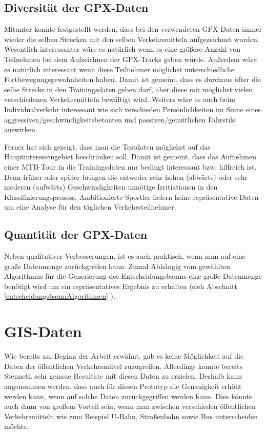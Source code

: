 \subsection{Diversität der GPX-Daten}
Mitunter konnte festgestellt werden, dass bei den verwendeten GPX-Daten immer wieder die selben Strecken mit den selben Verkehrsmitteln aufgezeichnet wurden. Wesentlich interessanter wäre es natürlich wenn es eine größere Anzahl von Teilnehmen bei dem Aufzeichnen der GPX-Tracks geben würde. Außerdem wäre es natürlich interessant wenn diese Teilnehmer möglichst unterschiedliche Fortbewegungsgewohnheiten haben. Damit ist gemeint, dass es durchaus öfter die selbe Strecke in den Trainingsdaten geben darf, aber diese mit möglichst vielen verschiedenen Verkehrsmitteln bewältigt wird. Weiters wäre es auch beim Individualverkehr interessant wie sich verschieden Persönlichkeiten im Sinne eines aggressiven/geschwindigkeitsbetonten und passiven/gemütlichen Fahrstils auswirken. 

Ferner hat sich gezeigt, dass man die Testdaten möglichst auf das Hauptinteressengebiet beschränken soll. Damit ist gemeint, dass das Aufnehmen einer MTB-Tour in die Trainingsdaten nur bedingt interessant bzw. hilfreich ist. Denn früher oder später bringen die entweder sehr hohen (abwärts) oder sehr niederen (aufwärts) Geschwindigkeiten unnötige Irritiationen in den Klassifizierungsprozess. Ambitionierte Sportler liefern keine repräsentative Daten um eine Analyse für den täglichen Verkehrsteilnehmer. 

\subsection{Quantität der GPX-Daten}
Neben qualitativer Verbesserungen, ist es auch praktisch, wenn man auf eine große Datenmenge zurückgreifen kann. Zumal Abhängig vom gewählten Algorithmus für die Generierung des Entscheidungsbaums eine große Datenmenge benötigt wird um ein repräsentatives Ergebnis zu erhalten (sieh Abschnitt \ref{entscheidungsbaumAlgorithmen} ).

\section{GIS-Daten}
Wie bereits am Beginn der Arbeit erwähnt, gab es keine Möglichkeit auf die Daten der öffentlichen Verkehrsmittel zuzugreifen. Allerdings konnte bereits Stenneth \cite{stenneth_transportation_2011} sehr genaue Resultate mit diesen Daten zu erzielen. Deshalb kann angenommen werden, dass auch für diesen Prototyp die Genauigkeit erhöht werden kann, wenn auf solche Daten zurückgegriffen werden kann. Dies könnte auch dann von großem Vorteil sein, wenn man zwischen verschieden öffentlichen Verkehrsmitteln wie zum Beispiel U-Bahn, Straßenbahn sowie Bus unterscheiden möchte. 

